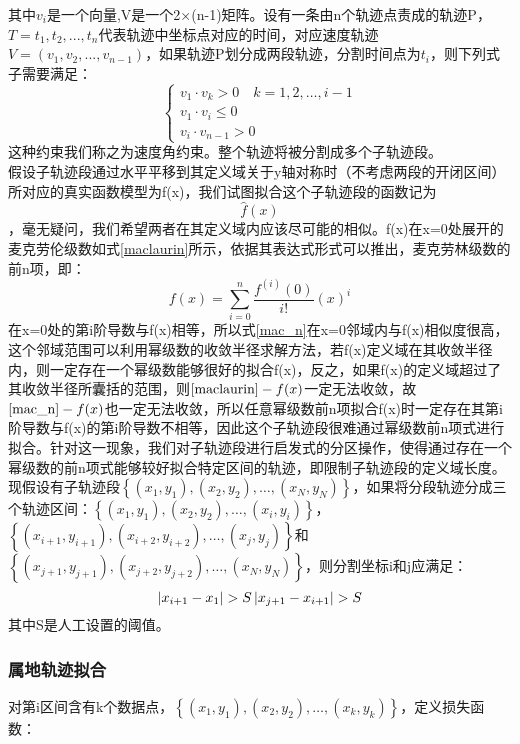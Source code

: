 其中$v_i$是一个向量,V是一个2×(n-1)矩阵。设有一条由n个轨迹点责成的轨迹P，$T={t_1,t_2,...,t_n}$代表轨迹中坐标点对应的时间，对应速度轨迹$V=(v_1,v_2,...,v_{n-1})$，如果轨迹P划分成两段轨迹，分割时间点为$t_i$，则下列式子需要满足：
\[
\left\{\begin{array}{c}
{v_{1} \cdot v_{k}>0 \quad k=1,2, \ldots, i-1} \\
{v_{1} \cdot v_{i} \leq 0} \\
{v_{i} \cdot v_{n-1}>0}
\end{array}\right.
\]
这种约束我们称之为速度角约束。整个轨迹将被分割成多个子轨迹段。\\
假设子轨迹段通过水平平移到其定义域关于y轴对称时（不考虑两段的开闭区间）所对应的真实函数模型为f(x)，我们试图拟合这个子轨迹段的函数记为$$\hat{f}\left( x \right) $$，毫无疑问，我们希望两者在其定义域内应该尽可能的相似。f(x)在x=0处展开的麦克劳伦级数如式\ref{maclaurin}所示，依据其表达式形式可以推出，麦克劳林级数的前n项，即：
\begin{equation}
\label{mac_n}
f\left( x \right) =\sum_{i=0}^n{\frac{f^{\left( i \right)}\left( 0 \right)}{i!}}\left( x \right) ^i
\end{equation}
在x=0处的第i阶导数与f(x)相等，所以式\ref{mac_n}在x=0邻域内与f(x)相似度很高，这个邻域范围可以利用幂级数的收敛半径求解方法，若f(x)定义域在其收敛半径内，则一定存在一个幂级数能够很好的拟合f(x)，反之，如果f(x)的定义域超过了其收敛半径所囊括的范围，则$\ref{maclaurin}-f(x)$一定无法收敛，故$\ref{mac_n}-f(x)$也一定无法收敛，所以任意幂级数前n项拟合f(x)时一定存在其第i阶导数与f(x)的第i阶导数不相等，因此这个子轨迹段很难通过幂级数前n项式进行拟合。针对这一现象，我们对子轨迹段进行启发式的分区操作，使得通过存在一个幂级数的前n项式能够较好拟合特定区间的轨迹，即限制子轨迹段的定义域长度。\\
现假设有子轨迹段$\left\{\left(x_{1}, y_{1}\right),\left(x_{2}, y_{2}\right), \dots,\left(x_{N}, y_{N}\right)\right\}$，如果将分段轨迹分成三个轨迹区间：$\left\{\left(x_{1}, y_{1}\right),\left(x_{2}, y_{2}\right), \dots,\left(x_{i}, y_{i}\right)\right\}$，$\left\{\left(x_{i+1}, y_{i+1}\right),\left(x_{i+2}, y_{i+2}\right), \ldots,\left(x_{j}, y_{j}\right)\right\}$和$\left\{\left(x_{j+1}, y_{j+1}\right),\left(x_{j+2}, y_{j+2}\right), \dots,\left(x_{N}, y_{N}\right)\right\}$，则分割坐标i和j应满足：
\[
\left|x_{i+1}-x_{1}\right|>S\\
\left|x_{j+1}-x_{i+1}\right|>S
\]
其中S是人工设置的阈值。



\subsubsection{属地轨迹拟合}
对第i区间含有k个数据点，$\left\{\left(x_{1}, y_{1}\right),\left(x_{2}, y_{2}\right), \ldots,\left(x_{k}, y_{k}\right)\right\}$，定义损失函数：

